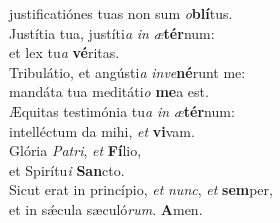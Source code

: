 \oddverse justificatiónes tuas non sum \textit{o}\textbf{blí}tus.\\
\evenverse Justítia tua, justíti\textit{a} \textit{in} \textit{æ}\textbf{tér}num:~\*\\
\evenverse et lex tu\textit{a} \textbf{vé}ritas.\\
\oddverse Tribulátio, et angústi\textit{a} \textit{in}\textit{ve}\textbf{né}runt me:~\*\\
\oddverse mandáta tua meditáti\textit{o} \textbf{me}a est.\\
\evenverse Æquitas testimónia tu\textit{a} \textit{in} \textit{æ}\textbf{tér}num:~\*\\
\evenverse intelléctum da mihi, \textit{et} \textbf{vi}vam.\\
\oddverse Glória \textit{Pa}\textit{tri}, \textit{et} \textbf{Fí}lio,~\*\\
\oddverse et Spirítu\textit{i} \textbf{San}cto.\\
\evenverse Sicut erat in princípio, \textit{et} \textit{nunc}, \textit{et} \textbf{sem}per,~\*\\
\evenverse et in sǽcula sæculó\textit{rum}. \textbf{A}men.\\
